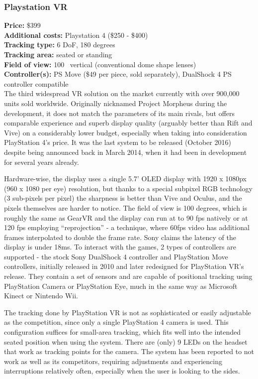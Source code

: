 \documentclass[12pt, a4paper]{article}
\begin{document}
\subsubsection{Playstation VR}
\vspace*{-5mm}
\textbf{Price:} \$399\\
\textbf{Additional costs:} Playstation 4 (\$250 - \$400)\\
\textbf{Tracking type:} 6 DoF, 180 degrees\\
\textbf{Tracking area:} seated or standing\\
\textbf{Field of view:} 100\degree~ vertical (conventional dome shape lenses)\\
\textbf{Controller(s):} PS Move (\$49 per piece, sold separately), DualShock 4 PS controller compatible \bigskip \\
The third widespread VR solution on the market currently with over 900,000 units sold worldwide. Originally nicknamed Project Morpheus during the development, it does not match the parameters of its main rivals, but offers comparable experience and superb display quality (arguably better than Rift and Vive) on a considerably lower budget, especially when taking into consideration PlayStation 4’s price. It was the last system to be released (October 2016) despite being announced back in March 2014, when it had been in development for several years already.

Hardware-wise, the display uses a single 5.7’ OLED display with 1920 x 1080px (960 x 1080 per eye) resolution, but thanks to a special subpixel RGB technology (3 sub-pixels per pixel)  the sharpness is better than Vive and Oculus, and the pixels themselves are harder to notice. The field of view is 100 degrees, which is roughly the same as GearVR and the display can run at to 90 fps natively or at 120 fps employing “reprojection” - a technique, where 60fps video has additional frames interpolated to double the frame rate. Sony claims the latency of the display is under 18ms. To interact with the games, 2 types of controllers are supported - the stock Sony DualShock 4 controller and PlayStation Move controllers, initially released in 2010 and later redesigned for PlayStation VR’s release. They contain a set of sensors and are capable of positional tracking using PlayStation Camera or PlayStation Eye, much in the same way as Microsoft Kinect or Nintendo Wii.

The tracking done by PlayStation VR is not as sophisticated or easily adjustable as the competition, since only a single PlayStation 4 camera is used. This configuration suffices for small-area tracking, which fits well into the intended seated position when using the system. There are (only) 9 LEDs on the headset that work as tracking points for the camera. The system has been reported to not work as well as its competitors, requiring adjustments and experiencing interruptions relatively often, especially when the user is looking to the sides.
\end{document}
